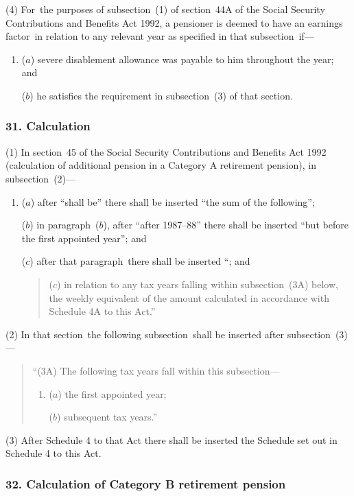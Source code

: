 \documentclass[12pt,a4paper]{article}
\begin{document}
(4) For~the purposes of subsection~(1)  of section~44A of the Social Security Contributions and Benefits Act 1992, a pensioner is deemed to have an earnings factor~in relation to any relevant year as specified in that subsection~if—
\begin{enumerate}\item[]
($a$) severe disablement allowance was payable to him throughout the year; and

($b$) he satisfies the requirement in subsection~(3)  of that section.
\end{enumerate}

\subsubsection{31. Calculation}

(1) In section~45 of the Social Security Contributions and Benefits Act 1992 (calculation of additional pension in a Category A retirement pension), in subsection~(2)—
\begin{enumerate}\item[]
($a$) after “shall be” there shall be inserted “the sum of the following”;

($b$) in paragraph~($b$), after “after 1987--88” there shall be inserted “but before the first appointed year”; and

($c$) after that paragraph~there shall be inserted “; and
\begin{quotation}
($c$) in relation to any tax years falling within subsection~(3A)  below, the weekly equivalent of the amount calculated in accordance with Schedule 4A to this Act.”
\end{quotation}
\end{enumerate}

(2) In that section~the following subsection~shall be inserted after subsection~(3)—
\begin{quotation}
“(3A) The following tax years fall within this subsection—
\begin{enumerate}\item[]
($a$) the first appointed year;

($b$) subsequent tax years.”
\end{enumerate}
\end{quotation}

(3) After Schedule 4 to that Act there shall be inserted the Schedule set out in Schedule 4 to this Act.

\subsubsection{32. Calculation of Category B retirement pension}
\end{document}
